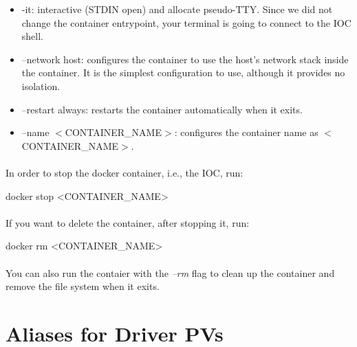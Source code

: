 \documentclass[openany]{article}
\begin{document}
        \begin{itemize}
          \item -it: interactive (STDIN open) and allocate pseudo-TTY. Since we did not change the container entrypoint, your terminal is going to connect to the IOC shell.
          \item --network host: configures the container to use the host's network stack inside the container. It is the simplest configuration to use, although it provides no isolation.
          \item --restart always: restarts the container automatically when it exits.
          \item --name $<$CONTAINER\_NAME$>$: configures the container name as $<$CONTAINER\_NAME$>$.
        \end{itemize}

        \paragraph{} In order to stop the docker container, i.e., the IOC, run:

        \vspace{1mm}
        \begin{code}
docker stop <CONTAINER_NAME>
        \end{code}
        \vspace{1mm}

        \paragraph{} If you want to delete the container, after stopping it, run:

        \vspace{1mm}
        \begin{code}
docker rm <CONTAINER_NAME>
        \end{code}
        \vspace{1mm}

        \paragraph{} You can also run the contaier with the \emph{--rm} flag to clean up the container and remove the file system when it exits.

\section{Aliases for Driver PVs}
\end{document}
